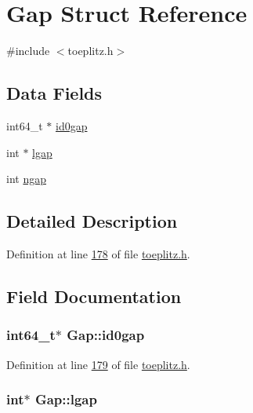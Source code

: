 \hypertarget{structGap}{\section{Gap Struct Reference}
\label{structGap}
}


{\ttfamily \#include $<$toeplitz.\-h$>$}

\subsection*{Data Fields}
\begin{DoxyCompactItemize}
\item 
int64\-\_\-t $\ast$ \hyperlink{structGap_af394dc30d7e23b7e65ba71d318335860}{id0gap}
\item 
int $\ast$ \hyperlink{structGap_a0ada50a4c5be9497f18198ab73290ae2}{lgap}
\item 
int \hyperlink{structGap_a210dec7193ddb9dfdd57e60ab83f2ee0}{ngap}
\end{DoxyCompactItemize}


\subsection{Detailed Description}


Definition at line \hyperlink{toeplitz_8h_source_l00178}{178} of file \hyperlink{toeplitz_8h_source}{toeplitz.\-h}.



\subsection{Field Documentation}
\hypertarget{structGap_af394dc30d7e23b7e65ba71d318335860}{
\subsubsection[{id0gap}]{\setlength{\rightskip}{0pt plus 5cm}int64\-\_\-t$\ast$ Gap\-::id0gap}}\label{structGap_af394dc30d7e23b7e65ba71d318335860}


Definition at line \hyperlink{toeplitz_8h_source_l00179}{179} of file \hyperlink{toeplitz_8h_source}{toeplitz.\-h}.

\hypertarget{structGap_a0ada50a4c5be9497f18198ab73290ae2}{
\subsubsection[{lgap}]{\setlength{\rightskip}{0pt plus 5cm}int$\ast$ Gap\-::lgap}}\label{structGap_a0ada50a4c5be9497f18198ab73290ae2}


